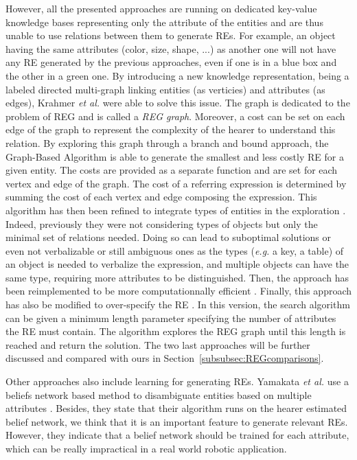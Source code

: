 \documentclass[a4paper,11pt,twoside]{StyleThese}
\begin{document}
However, all the presented approaches are running on dedicated key-value knowledge bases representing only the attribute of the entities and are thus unable to use relations between them to generate REs. For example, an object having the same attributes (color, size, shape, ...) as another one will not have any RE generated by the previous approaches, even if one is in a blue box and the other in a green one. By introducing a new knowledge representation, being a labeled directed multi-graph linking entities (as verticies) and attributes (as edges), Krahmer \textit{et al.} were able to solve this issue. The graph is dedicated to the problem of REG and is called a \textit{REG graph}. Moreover, a cost can be set on each edge of the graph to represent the complexity of the hearer to understand this relation. By exploring this graph through a branch and bound approach, the Graph-Based Algorithm \cite{krahmer2003graph} is able to generate the smallest and less costly RE for a given entity. The costs are provided as a separate function and are set for each vertex and edge of the graph. The cost of a referring expression is determined by summing the cost of each vertex and edge composing the expression. This algorithm has then been refined to integrate types of entities in the exploration \cite{krahmer2012computational}. Indeed, previously they were not considering types of objects but only the minimal set of relations needed. Doing so can lead to suboptimal solutions or even not verbalizable or still ambiguous ones as the types (\textit{e.g.} a key, a table) of an object is needed to verbalize the expression, and multiple objects can have the same type, requiring more attributes to be distinguished. Then, the approach has been reimplemented to be more computationnally efficient \cite{li2017automatically}. Finally, this approach has also be modified to over-specify the RE \cite{viethen2013graphs}. In this version, the search algorithm can be given a minimum length parameter specifying the number of attributes the RE must contain. The algorithm explores the REG graph until this length is reached and return the solution. The two last approaches will be further discussed and compared with ours in Section~\ref{subsubsec:REGcomparisons}.

Other approaches also include learning for generating REs. Yamakata \textit{et al.} use a beliefs network based method to disambiguate entities based on multiple attributes \cite{yamakata2004belief}. Besides, they state that their algorithm runs on the hearer estimated belief network, we think that it is an important feature to generate relevant REs. However, they indicate that a belief network should be trained for each attribute, which can be really impractical in a real world robotic application.
\end{document}
